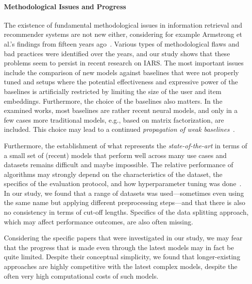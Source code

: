 \documentclass[sigconf,natbib=true,nonacm]{acmart}
\begin{document}
\paragraph{Methodological Issues and Progress}
The existence of fundamental methodological issues in information retrieval and recommender systems are not new either, considering for example Armstrong et al.'s findings from fifteen years ago~\cite{Armstrong:2009:IDA:1645953.1646031}. Various types of methodological flaws and bad practices were identified over the years, and our study shows that these problems seem to persist in recent research on IARS. The most important issues include the comparison of new models against baselines that were not properly tuned and setups where the potential effectiveness and expressive power of the baselines is artificially restricted by limiting the size of the user and item embeddings. Furthermore, the choice of the baselines also matters. In the examined works, most baselines are rather recent neural models, and only in a few cases more traditional models, e.g., based on matrix factorization, are included. This choice may lead to a continued \emph{propagation of weak baselines}~\cite{ferraridacremaetal2019}.

Furthermore, the establishment of what represents the \emph{state-of-the-art} in terms of a small set of (recent) models that perform well across many use cases and datasets remains difficult and maybe impossible. The relative performance of algorithms may strongly depend on the characteristics of the dataset, the specifics of the evaluation protocol, and how hyperparameter tuning was done~\cite{shehzad2023everyone}. In our study, we found that a range of datasets was used---sometimes even using the same name but applying different preprocessing steps---and that there is also no consistency in terms of cut-off lengths. Specifics of the data splitting approach, which may affect performance outcomes, are also often missing.

Considering the specific papers that were investigated in our study, we may fear that the progress that is made even through the latest models may in fact be quite limited. Despite their conceptual simplicity, we found that longer-existing approaches are highly competitive with the latest complex models, despite the often very high computational costs of such models.
\end{document}
